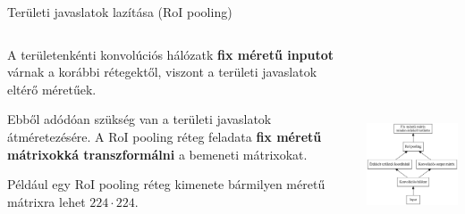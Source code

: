 \documentclass[english, aspectratio=169]{beamer}
\begin{document}
\begin{frame}{Területi javaslatok lazítása (RoI pooling)}
\begin{columns}
\begin{column}{.5\textwidth}
A területenkénti konvolúciós hálózatk \textbf{fix méretű inputot} várnak a korábbi rétegektől, viszont a területi javaslatok eltérő méretűek.\par\smallskip
Ebből adódóan szükség van a területi javaslatok átméretezésére. A RoI pooling réteg feladata \textbf{fix méretű mátrixokká transzformálni} a bemeneti mátrixokat.\par\smallskip
Például egy RoI pooling réteg kimenete bármilyen méretű mátrixra lehet $224 \cdot 224$.
\end{column}
\begin{column}{.5\textwidth}
\begin{center}
\includegraphics[height=7cm, width=7cm, keepaspectratio]{graphs/od_6.png}
\end{center}
\end{column}
\end{columns}
\end{frame}
\end{document}
